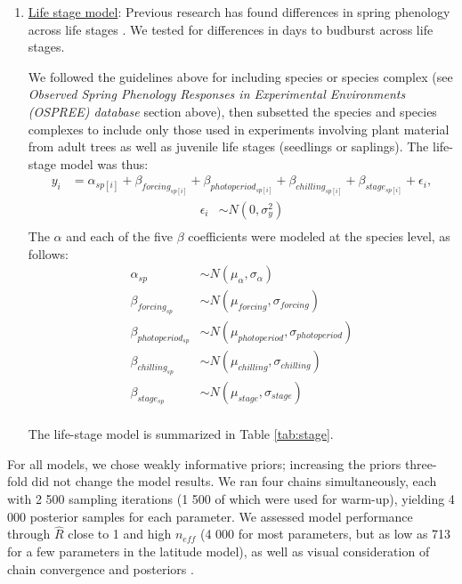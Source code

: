 \documentclass{article}
\begin{document}
\begin{enumerate}
\item \underline{Life stage model}:
Previous research has found differences in spring phenology across life stages \emph{\citep[][]{vitasse2013ont}}. We tested for differences in days to budburst across life stages. 
\par We followed the guidelines above for including species or species complex (see \emph{Observed Spring Phenology Responses in Experimental Environments (OSPREE) database} section above), then subsetted the species and species complexes to include only those used in experiments involving plant material from adult trees as well as juvenile life stages (seedlings or saplings). The life-stage model was thus:
\begin{align*}
y_i &= \alpha_{sp[i]} + \beta_{forcing_{sp[i]}} + \beta_{photoperiod_{sp[i]}} + \beta_{chilling_{sp[i]}} + \beta_{stage_{sp[i]}} + \epsilon_{i},
\end{align*}
\begin{align*}
\epsilon_i & \sim N(0,\sigma^2_y) \\
\end{align*}
\noindent The $\alpha$ and each of the five $\beta$ coefficients were modeled at the species level, as follows:
\begin{align*}
\alpha_{sp} & \sim N(\mu_{\alpha}, \sigma_{\alpha}) \\
\beta_{forcing_{sp}} & \sim N(\mu_{forcing}, \sigma_{forcing}) \\
\beta_{photoperiod_{sp}} & \sim N(\mu_{photoperiod}, \sigma_{photoperiod})\\
\beta_{chilling_{sp}} & \sim N(\mu_{chilling}, \sigma_{chilling})\\
\beta_{stage_{sp}} & \sim N(\mu_{stage}, \sigma_{stage})\\
\end{align*}
\par The life-stage model is summarized in Table \ref{tab:stage}.

\end{enumerate}
\noindent For all models, we chose weakly informative priors; increasing the priors three-fold did not change the model results. We ran four chains simultaneously, each with 2 500 sampling iterations (1 500 of which were used for warm-up), yielding 4 000 posterior samples for each parameter. We assessed model performance through $\hat{R}$ close to 1 and high $n_{eff}$ (4 000 for most parameters, but as low as 713 for a few parameters in the latitude model), as well as visual consideration of chain convergence and posteriors \emph{\citep{BDA}}. 
\end{document}
